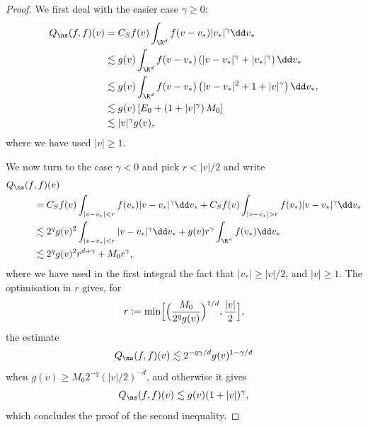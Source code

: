 \begin{proof}
We first deal with the easier case $\gamma \ge 0$:
\begin{align*}
Q_{\ns}(f,f)(v) & = C_S f(v) \int_{\R^d} f(v-v_*) |v_*|^\gamma \dd v_* \\
& \lesssim g(v) \int_{\R^d} f(v-v_*) \left(|v-v_*|^\gamma+ |v_*|^{\gamma}\right) \dd v_* \\
& \lesssim g(v) \int_{\R^d} f(v-v_*) \left(|v-v_*|^2+1 + |v|^{\gamma}\right) \dd v_*, \\
& \lesssim g(v) \left[ E_0 + \left(1+|v|^\gamma\right) M_0 \right] \\
& \lesssim |v|^\gamma g(v),
\end{align*}
where we have used $|v| \ge 1$.

We now turn to the case $\gamma <0$ and pick $r < |v|/2$ and write
\begin{align*}
Q_{\ns}(f&,f)(v) \\
& = C_S f(v) \int_{|v-v_*|< r} f(v_*) |v-v_*|^\gamma
\dd v_* + C_S f(v) \int_{|v-v_*| > r} f(v_*) |v-v_*|^\gamma \dd v_* \\
& \lesssim 2^ q g(v)^2 \int_{|v-v_*|< r} |v-v_*|^\gamma \dd v_*
+ g(v) r^{\gamma} \int_{\R^n} f(v_*) \dd v_* \\
& \lesssim 2^q g(v)^2 r^{d+\gamma} + M_0 r^{\gamma},
\end{align*}
where we have used in the first integral the fact that $|v_*| \ge
|v|/2$, and $|v| \ge 1$. The optimisation in $r$ gives, for
\[
r := \min \Bigl[ \Bigl(\frac{M_0}{2^q g(v)}\Bigl)^{1/d},
\frac{|v|}{2} \Bigl],
\]
the estimate
\begin{equation*}
Q_{\ns}(f,f)(v) \lesssim 2^{-q\gamma/d} g(v)^{1-\gamma/d}
\end{equation*}
when $g(v) \ge M_0 2^{-q} (|v|/2)^{-d}$, and otherwise it gives
\begin{equation*}
Q_{\ns}(f,f)(v) \lesssim g(v) (1+|v|)^\gamma,
\end{equation*}
which concludes the proof of the second inequality.


\end{proof}
